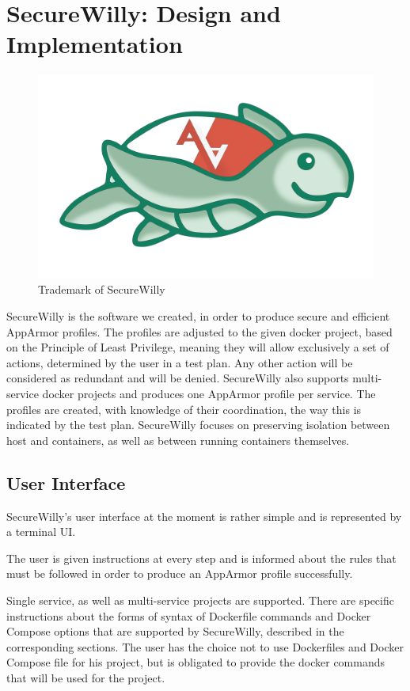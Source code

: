 \chapter{SecureWilly: Design and Implementation}
\begin{figure}[h!]
   \centering
   \includegraphics[width=0.45\linewidth]{../figures/trt.png}
   \caption{Trademark of SecureWilly}
\end{figure}

SecureWilly is the software we created, in order to produce secure and efficient AppArmor profiles. The profiles are adjusted to the given docker project, based on the Principle of Least Privilege, meaning they will allow exclusively a set of actions, determined by the user in a test plan. Any other action will be considered as redundant and will be denied. SecureWilly also supports multi-service docker projects and produces one AppArmor profile per service. The profiles are created, with knowledge of their coordination, the way this is indicated by the test plan. SecureWilly focuses on preserving isolation between host and containers, as well as between running containers themselves.

\section{User Interface}

SecureWilly's user interface at the moment is rather simple and is represented by a terminal UI.

The user is given instructions at every step and is informed about the rules that must be followed in order to produce an AppArmor profile successfully.

Single service, as well as multi-service projects are supported. There are specific instructions about the forms of syntax of Dockerfile commands and Docker Compose options that are supported by SecureWilly, described in the corresponding sections. The user has the choice not to use Dockerfiles and Docker Compose file for his project, but is obligated to provide the docker commands that will be used for the project.

